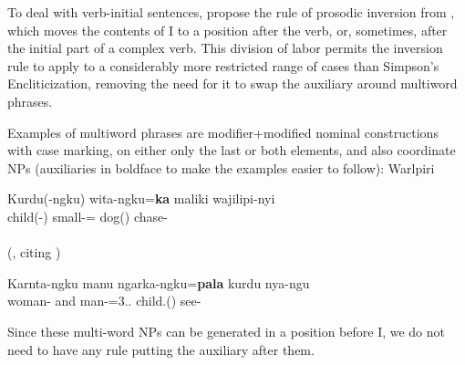 \documentclass[output=paper,hidelinks]{langscibook}
\begin{document}
To deal with verb-initial sentences,  \citeauthor{AustBres96} propose the rule of prosodic inversion from \citet{Halpern95},
which moves the
contents of I to a position after the verb, or, sometimes, after the initial part
of a complex verb.  This division of labor permits the inversion rule to apply to
a considerably more restricted range of cases than Simpson's Encliticization, removing
the need for it to swap the auxiliary around multiword phrases.

Examples of multiword phrases are modifier+modified nominal constructions with case marking,
on either only the last or both elements, %
and also coordinate NPs (auxiliaries in boldface to make the examples easier to follow):
\newpage
\ea Warlpiri
\begin{xlist}
\item
\gll Kurdu(-ngku) wita-ngku={\bf ka} maliki wajilipi-nyi\\
child(-\ERG) small-{\ERG}={\PRS} dog(\ABS) chase-{\NPST}\\
\\
(\citealt[159-160]{Nash1986}, citing \citet{Hale81})
\item
\gll Karnta-ngku manu ngarka-ngku={\bf pala} kurdu nya-ngu\\
woman-{\ERG} and man-{\ERG}=3.\DU.{\SUBJ} child.(\ABS) see-\PST\\
\citep[177]{Nash1986}
\end{xlist}
\z
Since these multi-word NPs can be generated in a position before I, we do not need to have
any rule putting the auxiliary after them.
\end{document}

